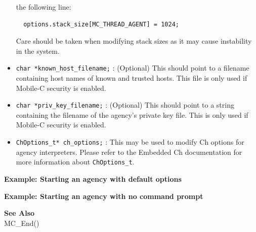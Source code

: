 \begin{itemize}
  the following line:
  \begin{verbatim}
  options.stack_size[MC_THREAD_AGENT] = 1024;
  \end{verbatim}
  Care should be taken when modifying stack sizes as it may cause instability
  in the system. 
  \item \texttt{char *known\_host\_filename;} : (Optional) This should point to
  a filename containing host names of known and trusted hosts. This file is only
  used if Mobile-C security is enabled.
  \item \texttt{char *priv\_key\_filename;} : (Optional) This should point to a
  string containing the filename of the agency's private key file. This is only
  used if Mobile-C security is enabled.
  \item \texttt{ChOptions\_t* ch\_options;} : This may be used to modify Ch 
  options for agency interpreters. Please refer to the Embedded Ch documentation
  for more information about \texttt{ChOptions\_t}.
\end{itemize}

\noindent
{\bf Example: Starting an agency with default options}\\
\noindent
{\footnotesize}

{\bf Example: Starting an agency with no command prompt}\\
\noindent
{\footnotesize}

\noindent
{\bf See Also}\\
MC\_End()

